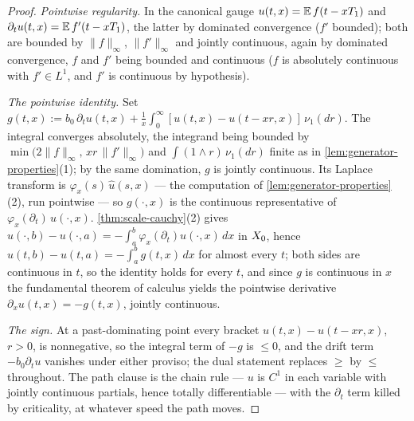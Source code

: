 \begin{proof}
\emph{Pointwise regularity.} In the canonical gauge $u(t,x) = \mathbb{E}\,f(t - xT_1)$ and
$\partial_t u(t,x) = \mathbb{E}\,f'(t - xT_1)$, the latter by dominated convergence ($f'$ bounded);
both are bounded by $\|f\|_\infty$, $\|f'\|_\infty$ and jointly continuous, again by
dominated convergence, $f$ and $f'$ being bounded and continuous ($f$ is absolutely
continuous with $f' \in L^1$, and $f'$ is continuous by hypothesis).

\emph{The pointwise identity.} Set
$g(t,x) := b_0\,\partial_t u(t,x) + \tfrac1x\int_0^\infty [u(t,x) - u(t-xr,x)]\,\nu_1(dr)$.
The integral converges absolutely, the integrand being bounded by
$\min\bigl(2\|f\|_\infty,\, xr\,\|f'\|_\infty\bigr)$ and $\int (1 \wedge r)\,\nu_1(dr)$
finite as in \ref{lem:generator-properties}(1); by the same domination, $g$ is jointly
continuous. Its Laplace transform is $\varphi_x(s)\,\hat u(s,x)$ --- the computation of
\ref{lem:generator-properties}(2), run pointwise --- so $g(\cdot, x)$ is the
continuous representative of $\varphi_x(\partial_t)\,u(\cdot,x)$. \ref{thm:scale-cauchy}(2)
gives $u(\cdot,b) - u(\cdot,a) = -\int_a^b \varphi_x(\partial_t)u(\cdot,x)\,dx$ in $X_0$,
hence $u(t,b) - u(t,a) = -\int_a^b g(t,x)\,dx$ for almost every $t$; both sides are
continuous in $t$, so the identity holds for every $t$, and since $g$ is continuous in $x$
the fundamental theorem of calculus yields the pointwise derivative
$\partial_x u(t,x) = -g(t,x)$, jointly continuous.

\emph{The sign.} At a past-dominating point every bracket $u(t,x) - u(t-xr,x)$, $r > 0$, is
nonnegative, so the integral term of $-g$ is $\le 0$, and the drift term $-b_0\partial_t u$
vanishes under either proviso; the dual statement replaces $\ge$ by $\le$ throughout.
The path clause is the chain rule --- $u$ is $C^1$ in each variable with jointly continuous
partials, hence totally differentiable --- with the $\partial_t$ term killed by criticality,
at whatever speed the path moves.
\end{proof}
